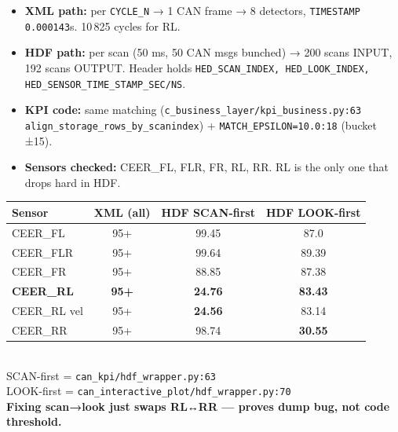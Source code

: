 \documentclass[11pt,a4paper]{article}
\begin{document}
\noindent
\begin{minipage}[t]{0.58\textwidth}
\begin{tcolorbox}[colback=white,colframe=lightGray,arc=2mm,boxsep=2mm,title=\textbf{What we tested (same log)}]
\begin{itemize}[leftmargin=4mm,itemsep=1mm,topsep=1mm]
  \item \textbf{XML path:} per \texttt{CYCLE\_N} → 1 CAN frame → 8 detectors, \texttt{TIMESTAMP 0.000143}s. 10\,825 cycles for RL.
  \item \textbf{HDF path:} per scan (50 ms, 50 CAN msgs bunched) → 200 scans INPUT, 192 scans OUTPUT. Header holds \texttt{HED\_SCAN\_INDEX, HED\_LOOK\_INDEX, HED\_SENSOR\_TIME\_STAMP\_SEC/NS}.
  \item \textbf{KPI code:} same matching (\texttt{c\_business\_layer/kpi\_business.py:63} \texttt{align\_storage\_rows\_by\_scanindex}) + \texttt{MATCH\_EPSILON=10.0:18} (bucket ±15).
  \item \textbf{Sensors checked:} CEER\_FL, FLR, FR, RL, RR. RL is the only one that drops hard in HDF.
\end{itemize}
\end{tcolorbox}
\end{minipage}
\hfill
\begin{minipage}[t]{0.40\textwidth}
\begin{tcolorbox}[colback=white,colframe=lightGray,arc=2mm,boxsep=2mm,title=\textbf{KPI result — exact run (scan-aligned)}]
\scriptsize
\begin{tabular}{lccc}
\toprule
\textcolor{midGray}{Sensor} & \textbf{XML (all)} & \textbf{HDF SCAN-first} & \textbf{HDF LOOK-first}\\
\midrule
CEER\_FL & 95+ & 99.45 & 87.0\\
CEER\_FLR & 95+ & 99.64 & 89.39\\
CEER\_FR & 95+ & 88.85 & 87.38\\
\rowcolor{diffRed} \textbf{CEER\_RL} & \textbf{95+} & \textbf{24.76} & \textbf{83.43}\\
\rowcolor{diffRed} CEER\_RL vel & 95+ & \textbf{24.56} & 83.14\\
CEER\_RR & 95+ & 98.74 & \textbf{30.55}\\
\bottomrule
\end{tabular}
\vspace{1mm}\\
\textcolor{midGray}{SCAN-first = \texttt{can\_kpi/hdf\_wrapper.py:63} }\\
\textcolor{midGray}{LOOK-first = \texttt{can\_interactive\_plot/hdf\_wrapper.py:70} }\\
\textcolor{bad}{\textbf{Fixing scan→look just swaps RL↔RR — proves dump bug, not code threshold.}}
\end{tcolorbox}
\end{minipage}
\end{document}
